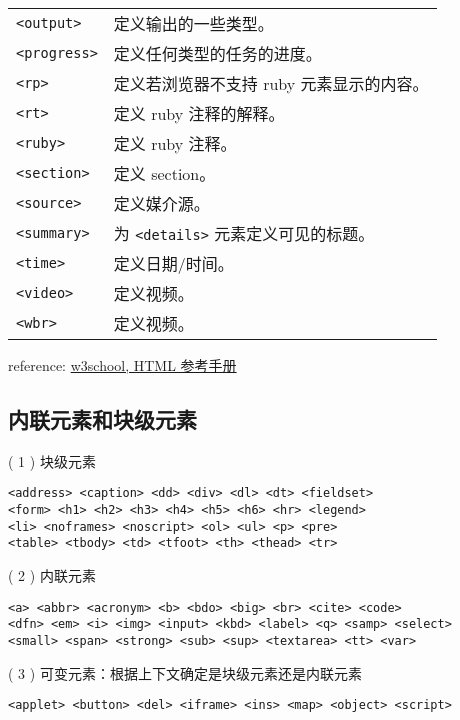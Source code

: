 \begin{longtable}{|l|l|}
\texttt{\textless{}output\textgreater{}} & 定义输出的一些类型。\\
\texttt{\textless{}progress\textgreater{}} & 定义任何类型的任务的进度。\\
\texttt{\textless{}rp\textgreater{}} & 定义若浏览器不支持 ruby 元素显示的内容。\\
\texttt{\textless{}rt\textgreater{}} & 定义 ruby 注释的解释。\\
\texttt{\textless{}ruby\textgreater{}} & 定义 ruby 注释。\\
\texttt{\textless{}section\textgreater{}} & 定义 section。\\
\texttt{\textless{}source\textgreater{}} & 定义媒介源。\\
\texttt{\textless{}summary\textgreater{}} & 为 \texttt{\textless{}details\textgreater{}} 元素定义可见的标题。\\
\texttt{\textless{}time\textgreater{}} & 定义日期/时间。\\
\texttt{\textless{}video\textgreater{}} & 定义视频。\\
\texttt{\textless{}wbr\textgreater{}} & 定义视频。\\
\hline
\end{longtable}   %

reference: \href{http://www.w3school.com.cn/tags/index.asp}{w3school, HTML 参考手册}

\subsection{内联元素和块级元素}\hypertarget{section}{}\label{section}

( 1 ) 块级元素

\begin{verbatim}<address> <caption> <dd> <div> <dl> <dt> <fieldset> 
<form> <h1> <h2> <h3> <h4> <h5> <h6> <hr> <legend>  
<li> <noframes> <noscript> <ol> <ul> <p> <pre> 
<table> <tbody> <td> <tfoot> <th> <thead> <tr>
\end{verbatim}

( 2 ) 内联元素

\begin{verbatim}<a> <abbr> <acronym> <b> <bdo> <big> <br> <cite> <code> 
<dfn> <em> <i> <img> <input> <kbd> <label> <q> <samp> <select> 
<small> <span> <strong> <sub> <sup> <textarea> <tt> <var> 
\end{verbatim}

( 3 ) 可变元素：根据上下文确定是块级元素还是内联元素

\begin{verbatim}<applet> <button> <del> <iframe> <ins> <map> <object> <script>
\end{verbatim}

